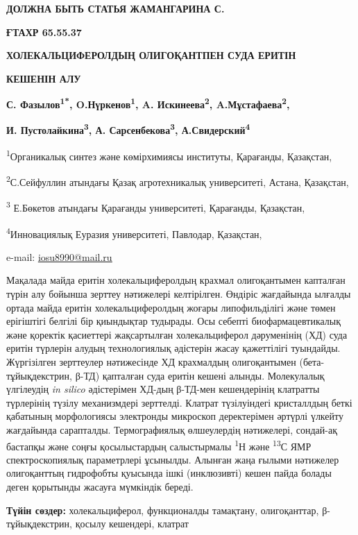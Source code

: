 {\bfseries ДОЛЖНА БЫТЬ СТАТЬЯ ЖАМАНГАРИНА С.}

{\bfseries ҒТАХР 65.55.37}

{\bfseries ХОЛЕКАЛЬЦИФЕРОЛДЫҢ ОЛИГОҚАНТПЕН СУДА ЕРИТІН}

{\bfseries КЕШЕНІН АЛУ}

{\bfseries С. Фазылов\textsuperscript{1*}, O.Нүркенов\textsuperscript{1},
A. Искинеева\textsuperscript{2}, A.Мұстафаева\textsuperscript{2},}

{\bfseries И. Пустолайкина\textsuperscript{3}, А.
Сарсенбекова\textsuperscript{3}, А.Свидерский\textsuperscript{4}}

\textsuperscript{1}Органикалық синтез және көмірхимиясы институты,
Қарағанды, Қазақстан,

\textsuperscript{2}С.Сейфуллин атындағы Қазақ агротехникалық
университеті, Астана, Қазақстан,

\textsuperscript{3} Е.Бөкетов атындағы Қарағанды университеті,
Қарағанды, Қазақстан,

\textsuperscript{4}Инновациялық Еуразия университеті, Павлодар,
Қазақстан,

e-mail: \href{mailto:iosu8990@mail.ru}{\ul{iosu8990@mail.ru}}

Мақалада майда еритін холекальциферолдың крахмал олигоқантымен капталған
түрін алу бойынша зерттеу нәтижелері келтірілген. Өндіріс жағдайында
ылғалды ортада майда еритін холекальциферолдың жоғары липофильділігі
және төмен ерігіштігі белгілі бір қиындықтар тудырады. Осы себепті
биофармацевтикалық және қоректік қасиеттері жақсартылған холекальциферол
дәруменінің (ХД) суда еритін түрлерін алудың технологиялық әдістерін
жасау қажеттілігі туындайды. Жүргізілген зерттеулер нәтижесінде ХД
крахмалдың олигоқантымен (бета-тұйықдекстрин, β-ТД) қапталған суда
еритін кешені алынды. Молекулалық үлгілеудің \emph{in silico}
әдістерімен ХД-дың β-ТД-мен кешендерінің клатратты түрлерінің түзілу
механизмдері зерттелді. Клатрат түзілуіндегі кристаллдың беткі қабатының
морфологиясы электронды микроскоп деректерімен әртүрлі үлкейту
жағдайында сарапталды. Термографиялық өлшеулердің нәтижелері, сондай-ақ
бастапқы және соңғы қосылыстардың салыстырмалы \textsuperscript{1}Н және
\textsuperscript{13}С ЯМР спектроскопиялық параметрлері ұсынылды.
Алынған жаңа ғылыми нәтижелер олигоқанттың гидрофобты қуысында ішкі
(инклюзивті) кешен пайда болады деген қорытынды жасауға мүмкіндік
береді.

{\bfseries Түйін сөздер:} холекальциферол, функционалды тамақтану,
олигоқанттар, β-тұйықдекстрин, қосылу кешендері, клатрат

